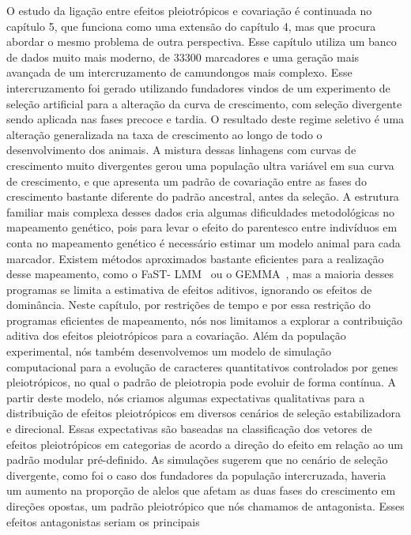 \begin{refsection}
O estudo da ligação entre efeitos pleiotrópicos e covariação é continuada no
capítulo 5, que funciona como uma extensão do capítulo 4, mas que procura
abordar o mesmo problema de outra perspectiva. Esse capítulo utiliza um banco
de dados muito mais moderno, de 33300 marcadores e uma geração mais avançada
de um intercruzamento de camundongos mais complexo. Esse intercruzamento foi
gerado utilizando fundadores vindos de um experimento de seleção artificial
para a alteração da curva de crescimento, com seleção divergente sendo
aplicada nas fases precoce e tardia. O resultado deste regime seletivo é uma
alteração generalizada na taxa de crescimento ao longo de todo o
desenvolvimento dos animais. A mistura dessas linhagens com curvas de
crescimento muito divergentes gerou uma população ultra variável em sua curva
de crescimento, e que apresenta um padrão de covariação entre as fases do
crescimento bastante diferente do padrão ancestral, antes da seleção. A
estrutura familiar mais complexa desses dados cria algumas dificuldades
metodológicas no mapeamento genético, pois para levar o efeito do parentesco
entre indivíduos em conta no mapeamento genético é necessário estimar um
modelo animal para cada marcador. Existem métodos aproximados bastante
eficientes para a realização desse mapeamento, como o FaST-
LMM~\parencite{Lippert2011-jn} ou o GEMMA~\parencite{Zhou2012-zl}, mas a
maioria desses programas se limita a estimativa de efeitos aditivos, ignorando
os efeitos de dominância. Neste capítulo, por restrições de tempo e por essa
restrição do programas eficientes de mapeamento, nós nos limitamos a explorar
a contribuição aditiva dos efeitos pleiotrópicos para a covariação. Além da
população experimental, nós também desenvolvemos um modelo de simulação
computacional para a evolução de caracteres quantitativos controlados por
genes pleiotrópicos, no qual o padrão de pleiotropia pode evoluir de forma
contínua. A partir deste modelo, nós criamos algumas expectativas qualitativas
para a distribuição de efeitos pleiotrópicos em diversos cenários de seleção
estabilizadora e direcional. Essas expectativas são baseadas na classificação
dos vetores de efeitos pleiotrópicos em categorias de acordo a direção do
efeito em relação ao um padrão modular pré-definido. As simulações sugerem que
no cenário de seleção divergente, como foi o caso dos fundadores da população
intercruzada, haveria um aumento na proporção de alelos que afetam as duas
fases do crescimento em direções opostas, um padrão pleiotrópico que nós
chamamos de antagonista. Esses efeitos antagonistas seriam os principais

\end{refsection}
